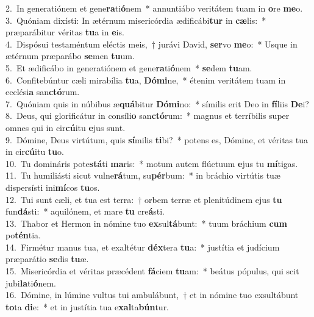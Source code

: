 {2.~}In generatiónem et gene\textbf{ra}ti\textbf{ó}nem~* annuntiábo veritátem tuam in \textbf{o}re \textbf{me}o.\\
{3.~}Quóniam dixísti: In ætérnum misericórdia ædificábi\textbf{tur} in \textbf{cæ}lis:~* præparábitur véritas \textbf{tu}a in \textbf{e}is.\\
{4.~}Dispósui testaméntum eléctis meis,~† jurávi David, \textbf{ser}vo \textbf{me}o:~* Usque in ætérnum præparábo \textbf{se}men \textbf{tu}um.\\
{5.~}Et ædificábo in generatiónem et gene\textbf{ra}ti\textbf{ó}nem~* \textbf{se}dem \textbf{tu}am.\\
{6.~}Confitebúntur cæli mirabília \textbf{tu}a, \textbf{Dó}\textbf{mi}ne,~* étenim veritátem tuam in ecclési\textbf{a} san\textbf{ctó}rum.\\
{7.~}Quóniam quis in núbibus æ\textbf{quá}bitur \textbf{Dó}\textbf{mi}no:~* símilis erit Deo in \textbf{fí}liis \textbf{De}i?\\
{8.~}Deus, qui glorificátur in consíli\textbf{o} san\textbf{ctó}rum:~* magnus et terríbilis super omnes qui in cir\textbf{cú}itu \textbf{e}jus sunt.\\
{9.~}Dómine, Deus virtútum, quis \textbf{sí}milis \textbf{ti}bi?~* potens es, Dómine, et véritas tua in cir\textbf{cú}itu \textbf{tu}o.\\
{10.~}Tu domináris pote\textbf{stá}ti \textbf{ma}ris:~* motum autem flúctuum \textbf{e}jus tu \textbf{mí}tigas.\\
{11.~}Tu humiliásti sicut vulne\textbf{rá}tum, su\textbf{pér}bum:~* in bráchio virtútis tuæ dispersísti ini\textbf{mí}cos \textbf{tu}os.\\
{12.~}Tui sunt cæli, et tua est terra:~† orbem terræ et plenitúdinem ejus \textbf{tu} fun\textbf{dá}sti:~* aquilónem, et mare \textbf{tu} cre\textbf{á}sti.\\
{13.~}Thabor et Hermon in nómine tuo \textbf{ex}sul\textbf{tá}bunt:~* tuum bráchium \textbf{cum} po\textbf{tén}tia.\\
{14.~}Firmétur manus tua, et exaltétur \textbf{déx}tera \textbf{tu}a:~* justítia et judícium præparátio \textbf{se}dis \textbf{tu}æ.\\
{15.~}Misericórdia et véritas præcédent \textbf{fá}ciem \textbf{tu}am:~* beátus pópulus, qui scit jubi\textbf{la}ti\textbf{ó}nem.\\
{16.~}Dómine, in lúmine vultus tui ambulábunt,~† et in nómine tuo exsultábunt \textbf{to}ta \textbf{di}e:~* et in justítia tua e\textbf{xal}ta\textbf{bún}tur.\\
